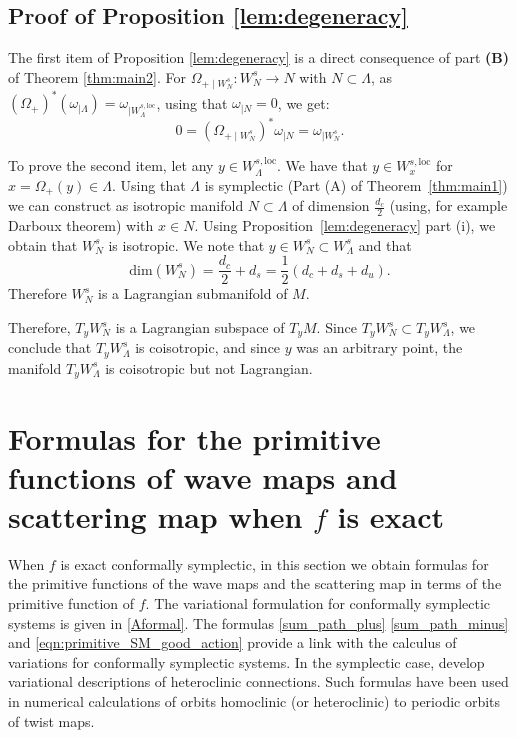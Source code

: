 \documentclass[11pt]{amsart}
\theoremstyle{definition}
\theoremstyle{remark}
\numberwithin{equation}{section}
\begin{document}
\subsection{Proof of Proposition \ref{lem:degeneracy} }\label{sec:proofisotropic}


The first item of Proposition \ref{lem:degeneracy} is a direct consequence of part {\bf(B)} of Theorem \ref{thm:main2}.
For $\Omega_{+\mid W^s_ N}:  W^s_ N \to N$ with $N\subset \Lambda$, as
$ (\Omega_+)^* (\omega_{|\Lambda}) = \omega_{|W^{s,\mathrm{loc}}_\Lambda}$, using that $\omega_{\mid N}=0$,  we get:
\[
0=(\Omega_{+\mid W^s_ N})^* \omega_{\mid N} = \omega_{\mid W^s_N}.
\]

To prove the second item, let  any $y \in W^{s,\mathrm{loc}}_\Lambda$. We have that $y \in W^{s,\mathrm{loc}}_x$ for
$x =\Omega_+(y)\in \Lambda$.
Using that $\Lambda$ is
symplectic (Part (A) of Theorem~\ref{thm:main1})
we can construct as isotropic manifold $N \subset \Lambda$ of
dimension $\frac{d_c}{2}$ (using, for example Darboux theorem) with $x\in N$.
Using Proposition~\ref{lem:degeneracy} part (i),
we obtain that $W^s_N$ is isotropic.
We note that $y \in W^s_N \subset W^s_\Lambda$
and that
\[
\text{dim}( W^s_N)  = \frac{d_c}{2} + d_s = \frac{1}{2}(d_c + d_s +d_u).
\]
Therefore $W^s_N$ is a Lagrangian submanifold of $M$.

Therefore,  $T_y W^s_N$ is a Lagrangian subspace of
$T_yM$.  Since $T_y W^s_N \subset T_y W^s_\Lambda$,
we conclude that  $T_y W^s_\Lambda$ is coisotropic,
and since $y$ was an arbitrary point, the manifold $T_y W^s_\Lambda$
is coisotropic but not Lagrangian.




\section{Formulas for the primitive functions of wave maps and  scattering map when $f$ is exact}
\label{sec:primitive_series}


When $f$ is exact conformally symplectic,  in this section
we obtain formulas for the primitive functions of  the wave maps
and the scattering map in terms of the primitive function of $f$.
The variational formulation for conformally symplectic systems
is given in \eqref{Aformal}.
The formulas  \eqref{sum_path_plus}
\eqref{sum_path_minus} and \eqref{eqn:primitive_SM_good_action}
provide a link with the calculus of variations for
conformally symplectic systems.
In the symplectic case,
\cite{Angenent93, Lomeli97,AmbrosettiB98}
develop variational descriptions of heteroclinic
connections. Such formulas have been used in numerical
calculations of orbits homoclinic (or heteroclinic) to periodic orbits  \cite{Tabacman95}
of twist maps.
\end{document}
